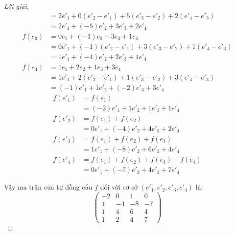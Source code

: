 \documentclass[class=linearalgebra,crop=false]{standalone}
\begin{document}
\begin{proof}[Lời giải]
\begin{align*}
                 & = 2e'_{1} + 0(e'_{2} - e'_{1}) + 5(e'_{3} - e'_{2}) + 2(e'_{4} - e'_{3})    \\
                 & = 2e'_{1} + (-5)e'_{2} + 3e'_{3} + 2e'_{4}                                  \\
        f(e_{3}) & = 0e_{1} + (-1)e_{2} + 3e_{3} + 1e_{4}                                      \\
                 & = 0e'_{1} + (-1)(e'_{2} - e'_{1}) + 3(e'_{3} - e'_{2}) + 1(e'_{4} - e'_{3}) \\
                 & = 1e'_{1} + (-4)e'_{2} + 2e'_{3} + 1e'_{4}                                  \\
        f(e_{4}) & = 1e_{1} + 2e_{2} + 1e_{3} + 3e_{4}                                         \\
                 & = 1e'_{1} + 2(e'_{2} - e'_{1}) + 1(e'_{3} - e'_{2}) + 3(e'_{4} - e'_{3})    \\
                 & = (-1)e'_{1} + 1e'_{2} + (-2)e'_{3} + 3e'_{4}
    \end{align*}
    \begin{align*}
        f(e'_{1}) & = f(e_{1})                                  \\
                  & = (-2)e'_{1} + 1e'_{2} + 1e'_{3} + 1e'_{4}  \\
        f(e'_{2}) & = f(e_{1}) + f(e_{2})                       \\
                  & = 0e'_{1} + (-4)e'_{2} + 4e'_{3} + 2e'_{4}  \\
        f(e'_{3}) & = f(e_{1}) + f(e_{2}) + f(e_{3})            \\
                  & = 1e'_{1} + (-8)e'_{2} + 6e'_{3} + 4e'_{4}  \\
        f(e'_{4}) & = f(e_{1}) + f(e_{2}) + f(e_{3}) + f(e_{4}) \\
                  & = 0e'_{1} + (-7)e'_{2} + 4e'_{3} + 7e'_{4}
    \end{align*}
    \par Vậy ma trận của tự đồng cấu $f$ đối với cơ sở $(e'_{1}, e'_{2}, e'_{3}, e'_{4})$ là:
    \[
        \begin{pmatrix}
            -2 & 0  & 1  & 0  \\
            1  & -4 & -8 & -7 \\
            1  & 4  & 6  & 4  \\
            1  & 2  & 4  & 7
        \end{pmatrix}
    \]
\end{proof}
\end{document}
